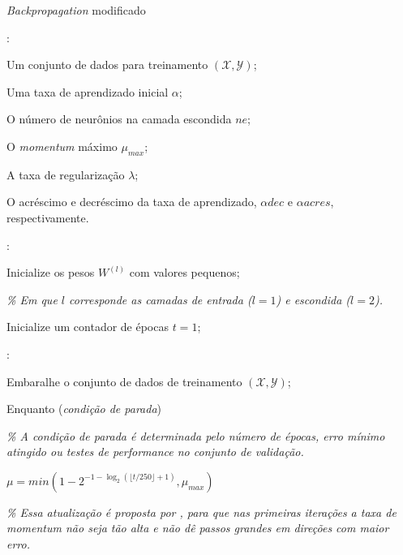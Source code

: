 \documentclass[12pt,a4paper,utf8]{ppgsi}
\begin{document}
\begin{algorithm}[htb]
\small
\caption{\textit{Backpropagation} modificado}
\label{alg:backprop}
\begin{algorithmic}
:
  \item Um conjunto de dados para treinamento $(\mathcal{X}, \mathcal{Y})$;
  \item Uma taxa de aprendizado inicial $\alpha$;
  \item O número de neurônios na camada escondida $ne$;
  \item O \textit{momentum} máximo $\mu_{max}$;
  \item A taxa de regularização $\lambda$;
  \item O acréscimo e decréscimo da taxa de aprendizado, $\alpha{dec}$ e $\alpha{acres}$, respectivamente.


\STATE
{}:
  \item Inicialize os pesos $W^{(l)}$ com valores pequenos;
  \item \hspace{1cm} {\it \footnotesize \% Em que $l$ corresponde as camadas de entrada ($l=1$) e escondida ($l=2$).}

  \item Inicialize um contador de épocas $t=1$;

\STATE

:

\item Embaralhe o conjunto de dados de treinamento $(\mathcal{X}, \mathcal{Y})$;

\item Enquanto (\textit{condição de parada})
\item \hspace{1cm} {\it \footnotesize \% A condição de parada é determinada pelo número de épocas, erro mínimo atingido ou testes de performance no conjunto de validação.}

\STATE

\item \hspace{0.5cm} $\mu = min(1 - 2^{- 1 - \log_2( \lfloor t/250 \rfloor + 1 )}, \mu_{max})$
\item \hspace{1.5cm} {\it \footnotesize \% Essa atualização é proposta por \cite{SutskeverMartensDahlHinton_icml2013}, para que nas primeiras iterações a taxa de momentum não seja tão alta e não dê passos grandes em direções com maior erro.}


\end{algorithmic}
\end{algorithm}
\end{document}
